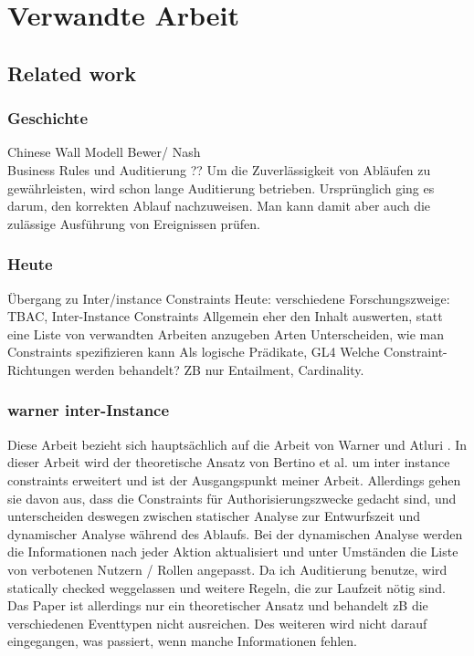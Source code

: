 
\chapter{Verwandte Arbeit} %

\label{Chapter3} %



\section{Related work}


\subsection{Geschichte}
Chinese Wall Modell Bewer/ Nash\\
Business Rules und Auditierung ??
Um die Zuverlässigkeit von Abläufen zu gewährleisten, wird schon lange Auditierung betrieben. Ursprünglich ging es darum, den korrekten Ablauf nachzuweisen. Man kann damit aber auch die zulässige Ausführung von Ereignissen prüfen.
\subsection{Heute}
Übergang zu Inter/instance Constraints
Heute: verschiedene Forschungszweige: TBAC, Inter-Instance Constraints
Allgemein eher den Inhalt auswerten, statt eine Liste von verwandten Arbeiten anzugeben
Arten Unterscheiden, wie man Constraints spezifizieren kann
Als logische Prädikate, GL4
Welche Constraint-Richtungen werden behandelt?
ZB nur Entailment, Cardinality. 
\subsection{warner inter-Instance}
Diese Arbeit bezieht sich hauptsächlich auf die Arbeit von Warner und Atluri \cite{warner_inter_instance}.
In dieser Arbeit wird der theoretische Ansatz von Bertino et al. um inter instance constraints erweitert und ist der Ausgangspunkt meiner Arbeit. Allerdings gehen sie davon aus, dass die Constraints für Authorisierungszwecke gedacht sind, und unterscheiden deswegen zwischen statischer Analyse zur Entwurfszeit und dynamischer Analyse während des Ablaufs. Bei der dynamischen Analyse werden die Informationen nach jeder Aktion  aktualisiert und unter Umständen die Liste von verbotenen Nutzern / Rollen angepasst.
Da ich Auditierung benutze, wird statically checked weggelassen und weitere Regeln, die zur Laufzeit nötig sind.\\
Das Paper ist allerdings nur ein theoretischer Ansatz und behandelt zB die verschiedenen Eventtypen nicht ausreichen. Des weiteren wird nicht darauf eingegangen, was passiert, wenn  manche Informationen fehlen.
